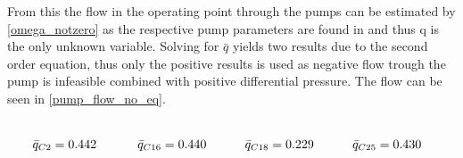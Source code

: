 From this the flow in the operating point through the pumps can be estimated by \eqref{omega_notzero} as the respective pump parameters are found in  and thus q is the only unknown variable.
Solving for $\bar{q}$ yields two results due to the second order equation, thus only the positive results is used as negative flow trough the pump is infeasible combined with positive differential pressure. The flow can be seen in \ref{pump_flow_no_eq}.

\vspace{-0.5cm}
\begin{equation}
  \begin{minipage}[b]{0.25\textwidth}
  \begin{equation*}
  	\begin{split}
  		\bar{q}_{C2} &= 0.442
  	\end{split}
  \end{equation*}
  \end{minipage}
  \begin{minipage}[b]{0.25\textwidth}
  \begin{equation*}
  	\begin{split}
  		\bar{q}_{C16} &= 0.440
  	\end{split}
  \end{equation*}

  \end{minipage}
  \begin{minipage}[b]{0.25\textwidth}
  \begin{equation*}
  	\begin{split}
  		\bar{q}_{C18} &= 0.229
  	\end{split}
  \end{equation*}
  \end{minipage}
  \begin{minipage}[b]{0.25\textwidth}
  \begin{equation*}
  	\begin{split}
  		\bar{q}_{C25} &= 0.430
  	\end{split}
  \end{equation*}
  \end{minipage}
  \label{pump_flow_no_eq}
\end{equation}
\vspace{-0.2cm}





